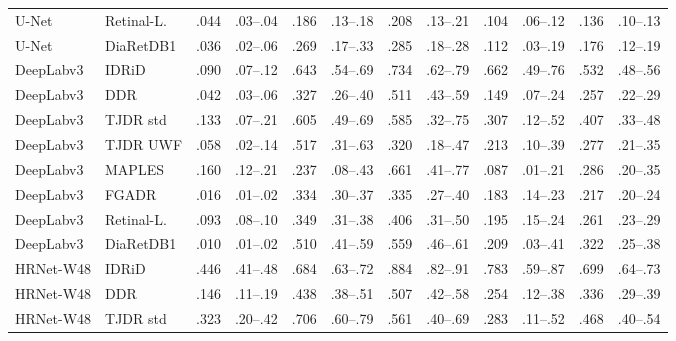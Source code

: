 \begin{landscape}
{\begin{longtable}{l l c c c c c c c c c c}
U-Net & Retinal-L. & .044 & \scriptsize .03--.04 & .186 & \scriptsize .13--.18 & .208 & \scriptsize .13--.21 & .104 & \scriptsize .06--.12 & .136 & \scriptsize .10--.13 \\
U-Net & DiaRetDB1 & .036 & \scriptsize .02--.06 & .269 & \scriptsize .17--.33 & .285 & \scriptsize .18--.28 & .112 & \scriptsize .03--.19 & .176 & \scriptsize .12--.19 \\
DeepLabv3 & IDRiD & .090 & \scriptsize .07--.12 & .643 & \scriptsize .54--.69 & .734 & \scriptsize .62--.79 & .662 & \scriptsize .49--.76 & .532 & \scriptsize .48--.56 \\
DeepLabv3 & DDR & .042 & \scriptsize .03--.06 & .327 & \scriptsize .26--.40 & .511 & \scriptsize .43--.59 & .149 & \scriptsize .07--.24 & .257 & \scriptsize .22--.29 \\
DeepLabv3 & TJDR std & .133 & \scriptsize .07--.21 & .605 & \scriptsize .49--.69 & .585 & \scriptsize .32--.75 & .307 & \scriptsize .12--.52 & .407 & \scriptsize .33--.48 \\
DeepLabv3 & TJDR UWF & .058 & \scriptsize .02--.14 & .517 & \scriptsize .31--.63 & .320 & \scriptsize .18--.47 & .213 & \scriptsize .10--.39 & .277 & \scriptsize .21--.35 \\
DeepLabv3 & MAPLES & .160 & \scriptsize .12--.21 & .237 & \scriptsize .08--.43 & .661 & \scriptsize .41--.77 & .087 & \scriptsize .01--.21 & .286 & \scriptsize .20--.35 \\
DeepLabv3 & FGADR & .016 & \scriptsize .01--.02 & .334 & \scriptsize .30--.37 & .335 & \scriptsize .27--.40 & .183 & \scriptsize .14--.23 & .217 & \scriptsize .20--.24 \\
DeepLabv3 & Retinal-L. & .093 & \scriptsize .08--.10 & .349 & \scriptsize .31--.38 & .406 & \scriptsize .31--.50 & .195 & \scriptsize .15--.24 & .261 & \scriptsize .23--.29 \\
DeepLabv3 & DiaRetDB1 & .010 & \scriptsize .01--.02 & .510 & \scriptsize .41--.59 & .559 & \scriptsize .46--.61 & .209 & \scriptsize .03--.41 & .322 & \scriptsize .25--.38 \\
HRNet-W48 & IDRiD & .446 & \scriptsize .41--.48 & .684 & \scriptsize .63--.72 & .884 & \scriptsize .82--.91 & .783 & \scriptsize .59--.87 & .699 & \scriptsize .64--.73 \\
HRNet-W48 & DDR & .146 & \scriptsize .11--.19 & .438 & \scriptsize .38--.51 & .507 & \scriptsize .42--.58 & .254 & \scriptsize .12--.38 & .336 & \scriptsize .29--.39 \\
HRNet-W48 & TJDR std & .323 & \scriptsize .20--.42 & .706 & \scriptsize .60--.79 & .561 & \scriptsize .40--.69 & .283 & \scriptsize .11--.52 & .468 & \scriptsize .40--.54 \\

\end{longtable}}
\end{landscape}

